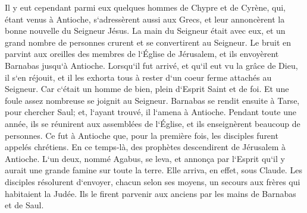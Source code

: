 \verse Il y eut cependant parmi eux quelques hommes de Chypre et de Cyrène, qui, étant venus à Antioche, s`adressèrent aussi aux Grecs, et leur annoncèrent la bonne nouvelle du Seigneur Jésus. 
\verse La main du Seigneur était avec eux, et un grand nombre de personnes crurent et se convertirent au Seigneur. 
\verse Le bruit en parvint aux oreilles des membres de l`Église de Jérusalem, et ils envoyèrent Barnabas jusqu`à Antioche. 
\verse Lorsqu`il fut arrivé, et qu`il eut vu la grâce de Dieu, il s`en réjouit, et il les exhorta tous à rester d`un coeur ferme attachés au Seigneur. 
\verse Car c`était un homme de bien, plein d`Esprit Saint et de foi. Et une foule assez nombreuse se joignit au Seigneur. 
\verse Barnabas se rendit ensuite à Tarse, pour chercher Saul; 
\verse et, l`ayant trouvé, il l`amena à Antioche. Pendant toute une année, ils se réunirent aux assemblées de l`Église, et ils enseignèrent beaucoup de personnes. Ce fut à Antioche que, pour la première fois, les disciples furent appelés chrétiens. 
\verse En ce temps-là, des prophètes descendirent de Jérusalem à Antioche. 
\verse L`un deux, nommé Agabus, se leva, et annonça par l`Esprit qu`il y aurait une grande famine sur toute la terre. Elle arriva, en effet, sous Claude. 
\verse Les disciples résolurent d`envoyer, chacun selon ses moyens, un secours aux frères qui habitaient la Judée. 
\verse Ils le firent parvenir aux anciens par les mains de Barnabas et de Saul. 

\chapter{}

